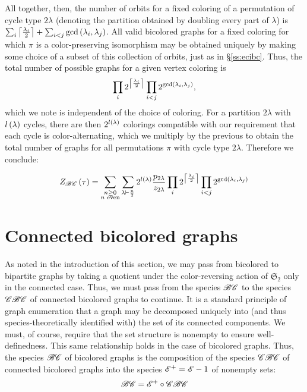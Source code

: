 \documentclass[sectionflow,singlespace,twoside]{brandiss} %
\numberwithin{section}{chapter}
\numberwithin{figure}{chapter}
\begin{document}
All together, then, the number of orbits for a fixed coloring of a permutation of cycle type $2 \lambda$ (denoting the partition obtained by doubling every part of $\lambda$) is $\sum_{i} \left\lceil {\frac{\lambda_{i}}{2}} \right\rceil + \sum_{i < j} \gcd \left( {\lambda_{i}, \lambda_{j}} \right)$.
All valid bicolored graphs for a fixed coloring for which $\pi$ is a color-preserving isomorphism may be obtained uniquely by making some choice of a subset of this collection of orbits, just as in \S \ref{ss:ecibc}.
Thus, the total number of possible graphs for a given vertex coloring is
\begin{equation*}
  \prod_{i} 2^{\left\lceil {\frac{\lambda_{i}}{2}} \right\rceil} \prod_{i < j} 2^{\gcd \left( {\lambda_{i}, \lambda_{j}} \right)},
\end{equation*}
which we note is independent of the choice of coloring.
For a partition $2\lambda$ with $l \left( {\lambda} \right)$ cycles, there are then $2^{l \left( {\lambda} \right)}$ colorings compatible with our requirement that each cycle is color-alternating, which we multiply by the previous to obtain the total number of graphs for all permutations $\pi$ with cycle type $2 \lambda$.
Therefore we conclude:
\begin{theorem}
  \begin{equation}
    \label{eq:tcibc}
    Z_{\mathscr{BC}} \left( {\tau} \right) = \sum_{\substack{n \geq 0 \\ \text{$n$ even}}} \sum_{\lambda \vdash \frac{n}{2}} 2^{l \left( {\lambda} \right)} \frac{p_{2 \lambda}}{z_{2 \lambda}} \prod_{i} 2^{\left\lceil {\frac{\lambda_{i}}{2}} \right\rceil} \prod_{i < j} 2^{\gcd \left( {\lambda_{i}, \lambda_{j}} \right)}
  \end{equation}
\end{theorem}

\section{Connected bicolored graphs}\label{s:cbc}
As noted in the introduction of this section, we may pass from bicolored to bipartite graphs by taking a quotient under the color-reversing action of $\mathfrak{S}_{2}$ only in the connected case.
Thus, we must pass from the species $\mathscr{BC}$ to the species $\mathscr{CBC}$ of connected bicolored graphs to continue.
It is a standard principle of graph enumeration that a graph may be decomposed uniquely into (and thus species-theoretically identified with) the set of its connected components.
We must, of course, require that the set structure is nonempty to ensure well-definedness.
This same relationship holds in the case of bicolored graphs.
Thus, the species $\mathscr{BC}$ of bicolored graphs is the composition of the species $\mathscr{CBC}$ of connected bicolored graphs into the species $\mathscr{E}^{+} = \mathscr{E} - 1$ of nonempty sets:
\begin{equation} \mathscr{BC} = \mathscr{E}^{+} \circ \mathscr{CBC} \label{eq:bcdecomp} \end{equation}
\end{document}
